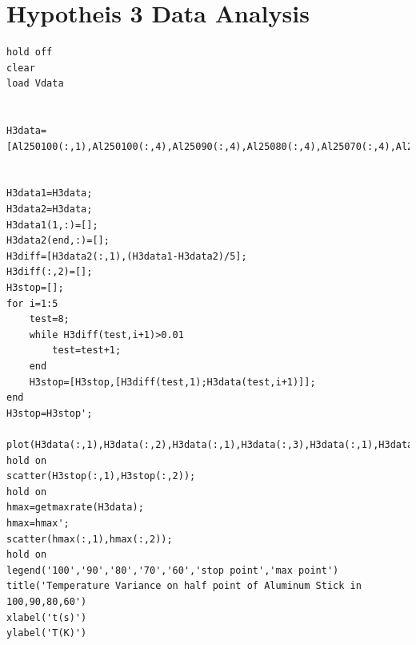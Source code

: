 \documentclass[12pt]{article}
\numberwithin{equation}{section}
\begin{document}
\section{Hypotheis 3 Data Analysis}
\begin{lstlisting}
hold off
clear 
load Vdata


H3data=[Al250100(:,1),Al250100(:,4),Al25090(:,4),Al25080(:,4),Al25070(:,4),Al25060(:,4)];


H3data1=H3data;
H3data2=H3data;
H3data1(1,:)=[];
H3data2(end,:)=[];
H3diff=[H3data2(:,1),(H3data1-H3data2)/5];
H3diff(:,2)=[];
H3stop=[];
for i=1:5
    test=8;
    while H3diff(test,i+1)>0.01
        test=test+1;
    end
    H3stop=[H3stop,[H3diff(test,1);H3data(test,i+1)]];
end
H3stop=H3stop';

plot(H3data(:,1),H3data(:,2),H3data(:,1),H3data(:,3),H3data(:,1),H3data(:,4),H3data(:,1),H3data(:,5),H3data(:,1),H3data(:,6))
hold on
scatter(H3stop(:,1),H3stop(:,2));
hold on
hmax=getmaxrate(H3data);
hmax=hmax';
scatter(hmax(:,1),hmax(:,2));
hold on
legend('100','90','80','70','60','stop point','max point')
title('Temperature Variance on half point of Aluminum Stick in 100,90,80,60')
xlabel('t(s)')
ylabel('T(K)')	
\end{lstlisting}









































	
\end{document}
